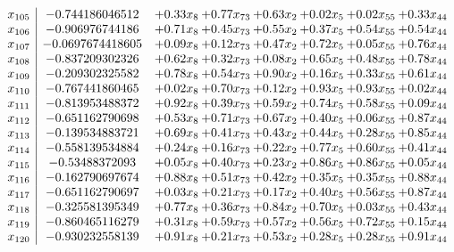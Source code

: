 \documentclass[8pt]{article}
\begin{document}
\[\begin{array}{c| c c@{\hskip 2pt} c@{\hskip 2pt} c@{\hskip 2pt} c@{\hskip 2pt} c@{\hskip 2pt} c@{\hskip 2pt} }
 x_{105}   &  -0.744186046512 & +  0.33 x_{8} & +  0.77 x_{73} & +  0.63 x_{2} & +  0.02 x_{5} & +  0.02 x_{55} & +  0.33 x_{44}\\
 x_{106}   &  -0.906976744186 & +  0.71 x_{8} & +  0.45 x_{73} & +  0.55 x_{2} & +  0.37 x_{5} & +  0.54 x_{55} & +  0.54 x_{44}\\
 x_{107}   &  -0.0697674418605 & +  0.09 x_{8} & +  0.12 x_{73} & +  0.47 x_{2} & +  0.72 x_{5} & +  0.05 x_{55} & +  0.76 x_{44}\\
 x_{108}   &  -0.837209302326 & +  0.62 x_{8} & +  0.32 x_{73} & +  0.08 x_{2} & +  0.65 x_{5} & +  0.48 x_{55} & +  0.78 x_{44}\\
 x_{109}   &  -0.209302325582 & +  0.78 x_{8} & +  0.54 x_{73} & +  0.90 x_{2} & +  0.16 x_{5} & +  0.33 x_{55} & +  0.61 x_{44}\\
 x_{110}   &  -0.767441860465 & +  0.02 x_{8} & +  0.70 x_{73} & +  0.12 x_{2} & +  0.93 x_{5} & +  0.93 x_{55} & +  0.02 x_{44}\\
 x_{111}   &  -0.813953488372 & +  0.92 x_{8} & +  0.39 x_{73} & +  0.59 x_{2} & +  0.74 x_{5} & +  0.58 x_{55} & +  0.09 x_{44}\\
 x_{112}   &  -0.651162790698 & +  0.53 x_{8} & +  0.71 x_{73} & +  0.67 x_{2} & +  0.40 x_{5} & +  0.06 x_{55} & +  0.87 x_{44}\\
 x_{113}   &  -0.139534883721 & +  0.69 x_{8} & +  0.41 x_{73} & +  0.43 x_{2} & +  0.44 x_{5} & +  0.28 x_{55} & +  0.85 x_{44}\\
 x_{114}   &  -0.558139534884 & +  0.24 x_{8} & +  0.16 x_{73} & +  0.22 x_{2} & +  0.77 x_{5} & +  0.60 x_{55} & +  0.41 x_{44}\\
 x_{115}   &  -0.53488372093 & +  0.05 x_{8} & +  0.40 x_{73} & +  0.23 x_{2} & +  0.86 x_{5} & +  0.86 x_{55} & +  0.05 x_{44}\\
 x_{116}   &  -0.162790697674 & +  0.88 x_{8} & +  0.51 x_{73} & +  0.42 x_{2} & +  0.35 x_{5} & +  0.35 x_{55} & +  0.88 x_{44}\\
 x_{117}   &  -0.651162790697 & +  0.03 x_{8} & +  0.21 x_{73} & +  0.17 x_{2} & +  0.40 x_{5} & +  0.56 x_{55} & +  0.87 x_{44}\\
 x_{118}   &  -0.325581395349 & +  0.77 x_{8} & +  0.36 x_{73} & +  0.84 x_{2} & +  0.70 x_{5} & +  0.03 x_{55} & +  0.43 x_{44}\\
 x_{119}   &  -0.860465116279 & +  0.31 x_{8} & +  0.59 x_{73} & +  0.57 x_{2} & +  0.56 x_{5} & +  0.72 x_{55} & +  0.15 x_{44}\\
 x_{120}   &  -0.930232558139 & +  0.91 x_{8} & +  0.21 x_{73} & +  0.53 x_{2} & +  0.28 x_{5} & +  0.28 x_{55} & +  0.91 x_{44}\\

\end{array}\]
\end{document}
